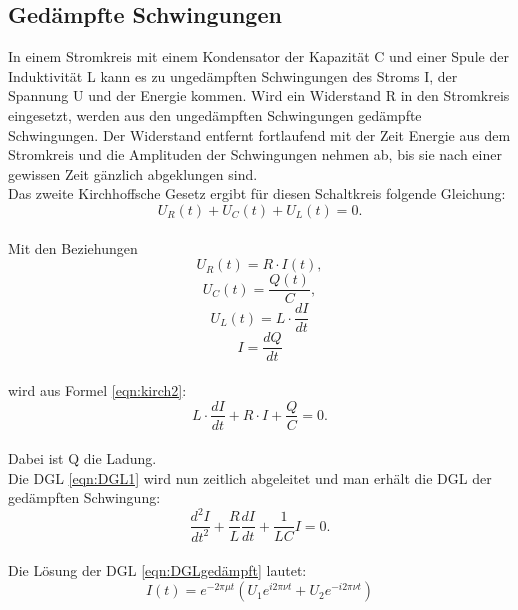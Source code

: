 \subsection{Gedämpfte Schwingungen}
In einem Stromkreis mit einem Kondensator der Kapazität C und einer Spule der Induktivität L kann es zu ungedämpften Schwingungen des Stroms I, der Spannung U und der Energie kommen.
Wird ein Widerstand R in den Stromkreis eingesetzt, werden aus den ungedämpften Schwingungen gedämpfte Schwingungen.
Der Widerstand entfernt fortlaufend mit der Zeit Energie aus dem Stromkreis und die Amplituden der Schwingungen nehmen ab, bis sie nach einer gewissen Zeit gänzlich abgeklungen sind.
\\Das zweite Kirchhoffsche Gesetz ergibt für diesen Schaltkreis folgende Gleichung:
\begin{equation}
  U_{R}(t) + U_{C}(t) + U_{L}(t) = 0.
  \label{eqn:kirch2}
\end{equation}
\\Mit den Beziehungen
\begin{equation*}
  U_{R}(t) = R \cdot I(t),
\end{equation*}
\begin{equation*}
  U_{C}(t) = \frac{Q(t)}{C},
\end{equation*}
\begin{equation*}
  U_{L}(t) = L \cdot \frac{dI}{dt}
\end{equation*}
\begin{equation*}
  I = \frac{dQ}{dt}
\end{equation*}
\\wird aus Formel \eqref{eqn:kirch2}:
\begin{equation}
  L \cdot \frac{dI}{dt} + R \cdot I + \frac{Q}{C} = 0.
  \label{eqn:DGL1}
\end{equation}
\\Dabei ist Q die Ladung.
\\Die DGL \eqref{eqn:DGL1} wird nun zeitlich abgeleitet und man erhält die DGL der gedämpften Schwingung:
\begin{equation}
  \frac{d^2 I}{d t^2} + \frac{R}{L} \frac{dI}{dt} + \frac{1}{LC} I = 0.
\label{eqn:DGLgedämpft}
\end{equation}
\\Die Lösung der DGL \eqref{eqn:DGLgedämpft} lautet:
\begin{equation}
  I(t)= e^{-2 \pi \mu t} \left( U_{1} e^{i 2 \pi \nu t} + U_{2} e^{-i 2 \pi \nu t} \right)
  \label{eqn:lsg}
\end{equation}
